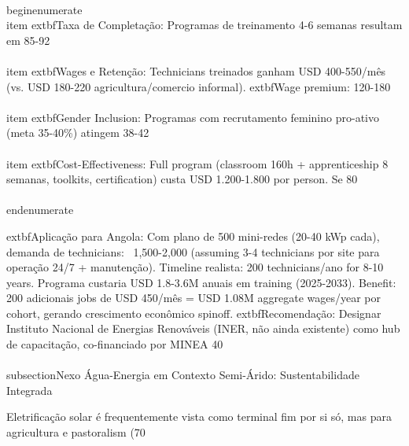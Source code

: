 \documentclass[12pt, a4paper]{article}
\begin{document}
{{{{{{{{{{{\\begin{enumerate}
\\item 	extbf{Taxa de Completação}: Programas de treinamento 4-6 semanas resultam em 85-92\\%
\\item 	extbf{Wages e Retenção}: Technicians treinados ganham USD 400-550/mês (vs. USD 180-220 agricultura/comercio informal). 	extbf{Wage premium}: 120-180\\%
\\item 	extbf{Gender Inclusion}: Programas com recrutamento feminino pro-ativo (meta 35-40\%) atingem 38-42\\%
\\item 	extbf{Cost-Effectiveness}: Full program (classroom 160h + apprenticeship 8 semanas, toolkits, certification) custa USD 1.200-1.800 por person. Se 80\\%
\\end{enumerate}

	extbf{Aplicação para Angola}: Com plano de 500 mini-redes (20-40 kWp cada), demanda de technicians: ~1,500-2,000 (assuming 3-4 technicians por site para operação 24/7 + manutenção). Timeline realista: 200 technicians/ano for 8-10 years. Programa custaria USD 1.8-3.6M anuais em training (2025-2033). Benefit: 200 adicionais jobs de USD 450/mês = USD 1.08M aggregate wages/year por cohort, gerando crescimento econômico spinoff. 	extbf{Recomendação}: Designar Instituto Nacional de Energias Renováveis (INER, não ainda existente) como hub de capacitação, co-financiado por MINEA 40\\%

\\subsection{Nexo Água-Energia em Contexto Semi-Árido: Sustentabilidade Integrada}

Eletrificação solar é frequentemente vista como terminal fim por si só, mas para agricultura e pastoralism (70\\%

}}}}}}}}}}}
\end{document}
